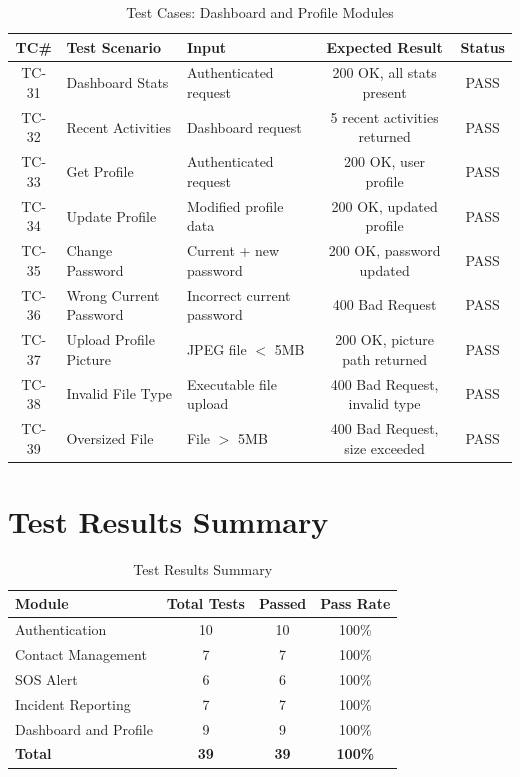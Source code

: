 \begin{table}[H]
  \centering
  \caption{Test Cases: Dashboard and Profile Modules}
  \label{tab:tc-dash-profile}
  \begin{tabularx}{\textwidth}{@{}c l X c c@{}}
    \toprule
    \textbf{TC\#} & \textbf{Test Scenario} & \textbf{Input} & \textbf{Expected Result} & \textbf{Status} \\
    \midrule
    TC-31 & Dashboard Stats & Authenticated request & 200 OK, all stats present & \textcolor{green!70!black}{PASS} \\
    TC-32 & Recent Activities & Dashboard request & 5 recent activities returned & \textcolor{green!70!black}{PASS} \\
    TC-33 & Get Profile & Authenticated request & 200 OK, user profile & \textcolor{green!70!black}{PASS} \\
    TC-34 & Update Profile & Modified profile data & 200 OK, updated profile & \textcolor{green!70!black}{PASS} \\
    TC-35 & Change Password & Current + new password & 200 OK, password updated & \textcolor{green!70!black}{PASS} \\
    TC-36 & Wrong Current Password & Incorrect current password & 400 Bad Request & \textcolor{green!70!black}{PASS} \\
    TC-37 & Upload Profile Picture & JPEG file $<$ 5MB & 200 OK, picture path returned & \textcolor{green!70!black}{PASS} \\
    TC-38 & Invalid File Type & Executable file upload & 400 Bad Request, invalid type & \textcolor{green!70!black}{PASS} \\
    TC-39 & Oversized File & File $>$ 5MB & 400 Bad Request, size exceeded & \textcolor{green!70!black}{PASS} \\
    \bottomrule
  \end{tabularx}
\end{table}

\section{Test Results Summary}

\begin{table}[H]
  \centering
  \caption{Test Results Summary}
  \label{tab:test-results}
  \begin{tabularx}{\textwidth}{@{}l c c c@{}}
    \toprule
    \textbf{Module} & \textbf{Total Tests} & \textbf{Passed} & \textbf{Pass Rate} \\
    \midrule
    Authentication & 10 & 10 & 100\% \\
    Contact Management & 7 & 7 & 100\% \\
    SOS Alert & 6 & 6 & 100\% \\
    Incident Reporting & 7 & 7 & 100\% \\
    Dashboard and Profile & 9 & 9 & 100\% \\
    \midrule
    \textbf{Total} & \textbf{39} & \textbf{39} & \textbf{100\%} \\
    \bottomrule
  \end{tabularx}
\end{table}

